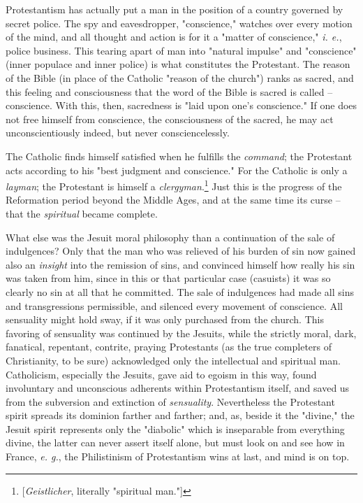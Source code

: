 Protestantism has actually put a man in the position of a country governed by 
secret police. The spy and eavesdropper, "{}conscience,"{} watches over every 
motion of the mind, and all thought and action is for it a "{}matter of 
conscience,"{} \textit{i. e.}, police business. This tearing apart of man into 
"{}natural impulse"{} and "{}conscience"{} (inner populace and inner police) 
is what constitutes the Protestant. The reason of the Bible (in place of the 
Catholic "{}reason of the church"{}) ranks as sacred, and this feeling and 
consciousness that the word of the Bible is sacred is called -- conscience. 
With this, then, sacredness is "{}laid upon one's conscience."{} If one does 
not free himself from conscience, the consciousness of the sacred, he may act 
unconscientiously indeed, but never consciencelessly.

The Catholic finds himself satisfied when he fulfills the \textit{command}; 
the Protestant acts according to his "{}best judgment and conscience."{} For 
the Catholic is only a \textit{layman}; the Protestant is himself a 
\textit{clergyman}.\footnote{[\textit{Geistlicher}, literally "{}spiritual 
man."{}]} Just this is the progress of the Reformation period beyond the 
Middle Ages, and at the same time its curse -- that the \textit{spiritual} 
became complete.

What else was the Jesuit moral philosophy than a continuation of the sale of 
indulgences? Only that the man who was relieved of his burden of sin now 
gained also an \textit{insight} into the remission of sins, and convinced 
himself how really his sin was taken from him, since in this or that 
particular case (casuists) it was so clearly no sin at all that he committed. 
The sale of indulgences had made all sins and transgressions permissible, and 
silenced every movement of conscience. All sensuality might hold sway, if it 
was only purchased from the church. This favoring of sensuality was continued 
by the Jesuits, while the strictly moral, dark, fanatical, repentant, 
contrite, praying Protestants (as the true completers of Christianity, to be 
sure) acknowledged only the intellectual and spiritual man. Catholicism, 
especially the Jesuits, gave aid to egoism in this way, found involuntary and 
unconscious adherents within Protestantism itself, and saved us from the 
subversion and extinction of \textit{sensuality}. Nevertheless the Protestant 
spirit spreads its dominion farther and farther; and, as, beside it the 
"{}divine,"{} the Jesuit spirit represents only the "{}diabolic"{} which is 
inseparable from everything divine, the latter can never assert itself alone, 
but must look on and see how in France, \textit{e. g.}, the Philistinism of 
Protestantism wins at last, and mind is on top.

